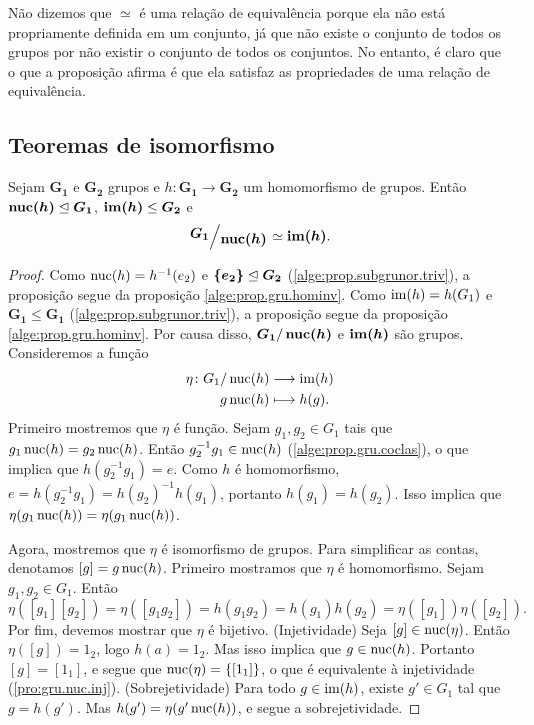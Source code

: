 Não dizemos que $\simeq$ é uma relação de equivalência porque ela não está propriamente definida em um conjunto, já que não existe o conjunto de todos os grupos por não existir o conjunto de todos os conjuntos. No entanto, é claro que o que a proposição afirma é que ela satisfaz as propriedades de uma relação de equivalência.

\subsection{Teoremas de isomorfismo}

\begin{theorem}
Sejam $\bm{G_1}$ e $\bm{G_2}$ grupos e $h: \bm{G_1} \to \bm{G_2}$ um homomorfismo de grupos. Então $\bm{\nuc(h)} \ide \bm{G_1}$, $\bm{\im(h)} \leq \bm{G_2}$ e 
	\begin{equation*}
	\bm{\quo{G_1}{\nuc(h)}} \simeq \bm{\im(h)}.
	\end{equation*}
\end{theorem}
\begin{proof} Como $\operatorname{nuc}(h) = h^{-1}(e_2)$ e $\bm{\{e_2\}} \mathrel{\unlhd} \bm{G_2}$ (\ref{alge:prop.subgrunor.triv}), a proposição segue da proposição \ref{alge:prop.gru.hominv}. Como $\operatorname{im}(h) = h(G_1)$ e $\bm{G_1} \leq \bm{G_1}$ (\ref{alge:prop.subgrunor.triv}), a proposição segue da proposição \ref{alge:prop.gru.hominv}. Por causa disso, $\bm{G_1}/\bm{\nuc(h)}$ e $\bm{\im(h)}$ são grupos. Consideremos a função
		\begin{align*}
		{\eta}\colon {G_1 / \operatorname{nuc}(h)} &\longrightarrow {\operatorname{im}(h)} \\{g\operatorname{nuc}(h)} &\longmapsto h(g).
		\end{align*}
Primeiro mostremos que $\eta$ é função. Sejam $g_1,g_2 \in G_1$ tais que $g_1\operatorname{nuc}(h) = g_2\operatorname{nuc}(h)$. Então $g_2^{-1}g_1 \in \operatorname{nuc}(h)$ (\ref{alge:prop.gru.coclas}), o que implica que $h(g_2^{-1}g_1) = e$. Como $h$ é homomorfismo, $e = h(g_2^{-1}g_1) = h(g_2)^{-1}h(g_1)$, portanto $h(g_1)=h(g_2)$. Isso implica que $\eta(g_1\operatorname{nuc}(h))=\eta(g_1\operatorname{nuc}(h))$.

Agora, mostremos que $\eta$ é isomorfismo de grupos. Para simplificar as contas, denotamos $[g] = g\operatorname{nuc}(h)$. Primeiro mostramos que $\eta$ é homomorfismo. Sejam $g_1,g_2 \in G_1$. Então
	\begin{equation*}
	\eta([g_1][g_2]) = \eta([g_1g_2]) = h(g_1g_2) = h(g_1)h(g_2) = \eta([g_1])\eta([g_2]).
	\end{equation*}
Por fim, devemos mostrar que $\eta$ é bijetivo. (Injetividade) Seja $[g] \in \operatorname{nuc}(\eta)$. Então $\eta([g])=1_{2}$, logo $h(a)=1_2$. Mas isso implica que $g \in \operatorname{nuc}(h)$. Portanto $[g]=[1_1]$, e segue que $\operatorname{nuc}(\eta)=\{[1_1]\}$, o que é equivalente à injetividade (\ref{pro:gru.nuc.inj}). (Sobrejetividade) Para todo $g \in \operatorname{im}(h)$, existe $g' \in G_1$ tal que $g=h(g')$. Mas $h(g')=\eta(g'\operatorname{nuc}(h))$, e segue a sobrejetividade.
\end{proof}

